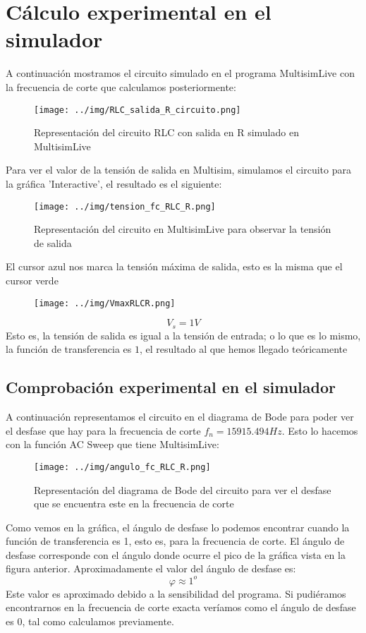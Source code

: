 \documentclass[11pt,letterpaper]{article}
\begin{document}
\section{Cálculo experimental en el simulador }
A continuación mostramos el circuito simulado en el programa MultisimLive con la frecuencia de corte que calculamos posteriormente:
\begin{figure}[H]
	\centering
	\texttt{[image: ../img/RLC\_salida\_R\_circuito.png]}
	\caption{Representación del circuito RLC con salida en R simulado en MultisimLive}
	\label{fig:img-RLC_salida_L-png}
\end{figure}
Para ver el valor de la tensión de salida en Multisim, simulamos el circuito para la gráfica 'Interactive', el resultado es el siguiente:
\begin{figure}[H]
	\centering
	\texttt{[image: ../img/tension\_fc\_RLC\_R.png]}
	\caption{Representación del circuito en MultisimLive para observar la tensión de salida }
	\label{fig:}
\end{figure}
El cursor azul nos marca la tensión máxima de salida, esto es la misma que el cursor verde
\begin{figure}[H]
    \centering
    \texttt{[image: ../img/VmaxRLCR.png]}
\end{figure}
\begin{equation}
	\boxed{V_s= 1 V}
\end{equation}
Esto es, la tensión de salida es igual a la tensión de entrada; o lo que es lo mismo, la función de transferencia es $1$, el resultado al que hemos llegado teóricamente
\subsection{Comprobación experimental en el simulador}
A continuación representamos el circuito en el diagrama de Bode para poder ver el desfase que hay para la frecuencia de corte $f_n=15915.494 Hz$. Esto lo hacemos con la función AC Sweep que tiene MultisimLive:
\begin{figure}[H]
	\centering
	\texttt{[image: ../img/angulo\_fc\_RLC\_R.png]}
	\caption{Representación del diagrama de Bode del circuito para ver el desfase que se encuentra este en la frecuencia de corte}
	\label{fig:-img-angulo_fc-png}
\end{figure}
Como vemos en la gráfica, el ángulo de desfase lo podemos encontrar cuando la función de transferencia es 1, esto es, para la frecuencia de corte. El ángulo de desfase corresponde con el ángulo donde ocurre el pico de la gráfica vista en la figura anterior. Aproximadamente el valor del ángulo de desfase es:
\begin{equation} 
	\boxed{\varphi \approx 1^o}
\end{equation}
Este valor es aproximado debido a la sensibilidad del programa. Si pudiéramos encontrarnos en la frecuencia de corte exacta veríamos como el ángulo de desfase es $0$, tal como calculamos previamente.
\end{document}
